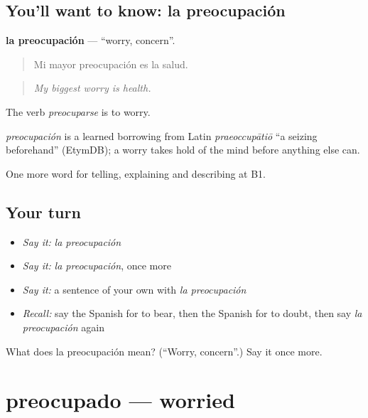 \subsection*{You'll want to know: la preocupación}
\textbf{la preocupación} — \textquotedblleft{}worry, concern\textquotedblright{}.

\begin{quote}
Mi mayor preocupación es la salud.
\end{quote}

\begin{quote}
\emph{My biggest worry is health.}
\end{quote}

The verb \emph{preocuparse} is to worry.

\begin{cousinweb}
\emph{preocupación} is a learned borrowing from Latin \emph{praeoccupātiō} \textquotedblleft{}a seizing beforehand\textquotedblright{} (EtymDB); a worry takes hold of the mind before anything else can.
\end{cousinweb}

\begin{grammarlens}[title={What you've built}]
One more word for telling, explaining and describing at B1.
\end{grammarlens}

\subsection*{Your turn}
\begin{itemize}
\raggedright
  \item \emph{Say it:} \emph{la preocupación}
  \item \emph{Say it:} \emph{la preocupación}, once more
  \item \emph{Say it:} a sentence of your own with \emph{la preocupación}
  \item \emph{Recall:} say the Spanish for to bear, then the Spanish for to doubt, then say \emph{la preocupación} again
\end{itemize}

\begin{tcolorbox}[breakable,colback=teal!4,colframe=teal!35!black,title={Before you move on}]
What does la preocupación mean? (\textquotedblleft{}Worry, concern\textquotedblright{}.) Say it once more.
\end{tcolorbox}
\section[preocupado]{preocupado — worried}

